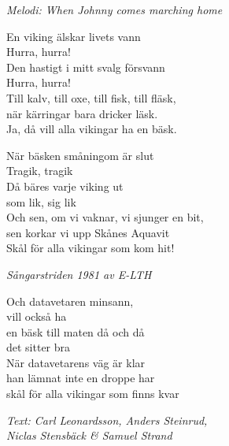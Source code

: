 {\footnotesize\textit{Melodi: When Johnny comes marching home}}\par
\vspace{10pt}
En viking älskar livets vann\\
Hurra, hurra!\\
Den hastigt i mitt svalg försvann\\
Hurra, hurra!\\
Till kalv, till oxe, till fisk, till fläsk,\\
när kärringar bara dricker läsk.\\
Ja, då vill alla vikingar ha en bäsk.\par
\vspace{10pt}
När bäsken småningom är slut\\
Tragik, tragik\\
Då bäres varje viking ut\\
som lik, sig lik\\
Och sen, om vi vaknar, vi sjunger en bit,\\
sen korkar vi upp Skånes Aquavit\\
Skål för alla vikingar som kom hit!\par
\vspace{10pt}
{\footnotesize\textit{Sångarstriden 1981 av E-LTH}}\par
\vspace{10pt}
Och datavetaren minsann,\\
vill också ha\\
en bäsk till maten då och då\\
det sitter bra\\
När datavetarens väg är klar\\
han lämnat inte en droppe har\\
skål för alla vikingar som finns kvar\par
\vspace{10pt}
{\footnotesize\textit{Text: Carl Leonardsson, Anders Steinrud,\\ Niclas Stensbäck \& Samuel Strand}}
